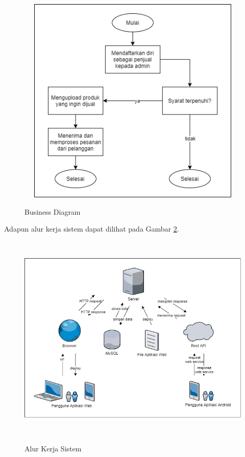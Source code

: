\begin{figure}[H]
\centering
{\includegraphics [width = 14cm, height= 10cm]{gambar/bisnis_diagram}}
\caption{Business Diagram}
\label{bisnis_diagram}
\end{figure}

Adapun alur kerja sistem dapat dilihat pada Gambar \ref{alur_kerja_sistem}.

\begin{figure}[H]
\centering
{\includegraphics [width = 14cm, height= 10cm]{gambar/alur_kerja_sistem}}
\caption{Alur Kerja Sistem}
\label{alur_kerja_sistem}
\end{figure}

